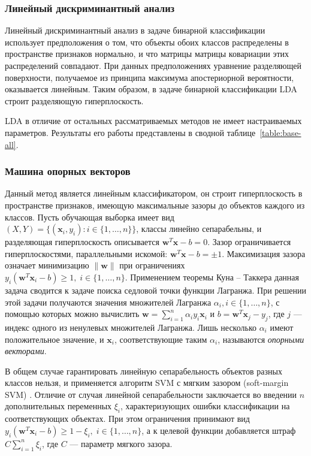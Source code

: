 \subsubsection{Линейный дискриминантный анализ}
Линейный дискриминантный анализ в задаче бинарной классификации использует предположения о том, что объекты обоих классов распределены в пространстве признаков нормально, и что матрицы матрицы ковариации этих распределений совпадают. При данных предположениях уравнение разделяющей поверхности, получаемое из принципа максимума апостериорной вероятности, оказывается линейным. Таким образом, в задаче бинарной классификации LDA строит разделяющую гиперплоскость.

LDA в отличие от остальных рассматриваемых методов не имеет настраиваемых параметров. Результаты его работы представлены в сводной таблице~\ref{table:base-all}.

\subsubsection{Машина опорных векторов}
Данный метод является линейным классификатором, он строит гиперплоскость в пространстве признаков, имеющую максимальные зазоры до объектов каждого из классов. Пусть обучающая выборка имеет вид \(\left(X, Y\right)=\{\left(\mathbf{x}_i,y_i\right):i\in\{1,\dotsc,n\}\}\), классы линейно сепарабельны, и разделяющая гиперплоскость описывается \(\mathbf{w}^T\mathbf{x}-b=0\). Зазор ограничивается гиперплоскостями, параллельными искомой: \(\mathbf{w}^T\mathbf{x}-b=\pm1\). Максимизация зазора означает минимизацию \(\|\mathbf{w}\|\) при ограничениях \(y_i\left(\mathbf{w}^T\mathbf{x}_i-b\right)\geqslant1,\;i\in\{1,\dotsc,n\}\). Применением теоремы Куна -- Таккера данная задача сводится к задаче поиска седловой точки функции Лагранжа. При решении этой задачи получаются значения множителей Лагранжа \(\alpha_i, i\in\{1,\dotsc,n\}\), с помощью которых можно вычислить \(\mathbf{w}=\sum_{i=1}^n \alpha_i y_i\mathbf{x}_i\) и \(b=\mathbf{w}^T\mathbf{x}_j-y_j\), где \(j\) --- индекс одного из ненулевых множителей Лагранжа. Лишь несколько \(\alpha_i\) имеют положительное значение, и \(\mathbf{x}_i\), соответствующие таким \(\alpha_i\), называются \emph{опорными векторами}.

В общем случае гарантировать линейную сепарабельность объектов разных классов нельзя, и применяется алгоритм SVM с мягким зазором (soft-margin SVM) \cite{cortes-vapnik}. Отличие от случая линейной сепарабельности заключается во введении \(n\) дополнительных переменных \(\xi_i\), характеризующих ошибки классификации на соответствующих объектах. При этом ограничения принимают вид \(y_i\left(\mathbf{w}^T\mathbf{x}_i - b\right)\geqslant 1-\xi_i,\;i\in\{1,\dotsc,n\}\), а к целевой функции добавляется штраф \(C\sum_{i=1}^n\xi_i\), где \(C\) --- параметр мягкого зазора.

